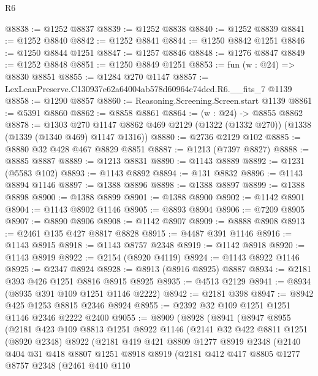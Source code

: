 \begin{lexlean}{R6}
\begin{coremodule}
@8838 := @1252 @8837
@8839 := @1252 @8838
@8840 := @1252 @8839
@8841 := @1252 @8840
@8842 := @1252 @8841
@8844 := @1250 @8842 @1251
@8846 := @1250 @8844 @1251
@8847 := @1257 @8846
@8848 := @1276 @8847
@8849 := @1252 @8848
@8851 := @1250 @8849 @1251
@8853 := fun (w : @24) => @8830 @8851
@8855 := @1284 @270 @1147
@8857 := LexLeanPreserve.C130937e62a64004ab578d60964c74dcd.R6.__fits_7 @1139
@8858 := @1290 @8857
@8860 := Reasoning.Screening.Screen.start @1139
@8861 := @5391 @8860
@8862 := @8858 @8861
@8864 := (w : @24) -> @8855 @8862
@8878 := @1303
    @270
    @1147
    @8862
    @469
    @2129
    (@1322 (@1332 @270))
    (@1338 (@1339 (@1340 @469) @1147 @1316))
@8880 := @2736 @2129 @102
@8885 := @8880 @32 @428 @467 @8829 @8851
@8887 := @1213 (@7397 @8827)
@8888 := @8885 @8887
@8889 := @1213 @8831
@8890 := @1143 @8889
@8892 := @1231 (@5583 @102)
@8893 := @1143 @8892
@8894 := @131 @8832
@8896 := @1143 @8894 @1146
@8897 := @1388 @8896
@8898 := @1388 @8897
@8899 := @1388 @8898
@8900 := @1388 @8899
@8901 := @1388 @8900
@8902 := @1142 @8901
@8904 := @1143 @8902 @1146
@8905 := @8893 @8904
@8906 := @7209 @8905
@8907 := @8890 @8906
@8908 := @1142 @8907
@8909 := @8888 @8908
@8913 := @2461 @135 @427 @8817 @8828
@8915 := @4487 @391 @1146
@8916 := @1143 @8915
@8918 := @1143 @8757 @2348
@8919 := @1142 @8918
@8920 := @1143 @8919
@8922 := @2154 (@8920 @4119)
@8924 := @1143 @8922 @1146
@8925 := @2347 @8924
@8928 := @8913 (@8916 @8925) @8887
@8934 := @2181 @393 @426 @1251 @8816 @8915 @8925
@8935 := @4513 @2129
@8941 := @8934 (@8935 @391 @109 @1251 @1146 @2222)
@8942 := @2181 @398
@8947 := @8942 @425 @1253 @8815 @2346 @8924
@8955 := @2392 @32 @109 @1251 @1251 @1146 @2346 @2222 @2400
@9055 := @8909
    (@8928
      (@8941
        (@8947
          @8955
          (@2181
            @423
            @109
            @8813
            @1251
            @8922
            @1146
            (@2141
              @32
              @422
              @8811
              @1251
              (@8920 @2348)
              @8922
              (@2181
                @419
                @421
                @8809
                @1277
                @8919
                @2348
                (@2140
                  @404
                  @31
                  @418
                  @8807
                  @1251
                  @8918
                  @8919
                  (@2181
                    @412
                    @417
                    @8805
                    @1277
                    @8757
                    @2348
                    (@2461
                      @410
                      @110

\end{coremodule}
\end{lexlean}

